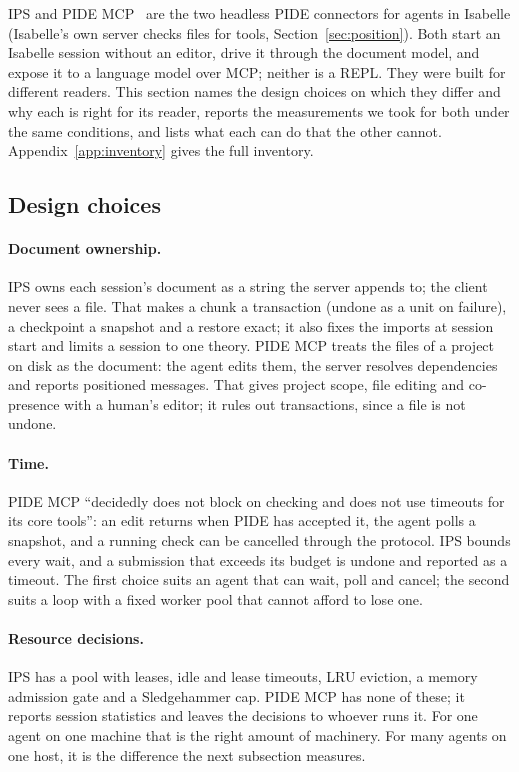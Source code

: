 \documentclass[11pt]{article}
\begin{document}
IPS and PIDE MCP~\cite{kappelmann2026pidemcp} are the two headless PIDE
connectors for agents in Isabelle (Isabelle's own server checks files for
tools, Section~\ref{sec:position}). Both start an Isabelle session without an
editor, drive it through the document model, and expose it to a language
model over MCP; neither is a REPL. They were built for different readers.
This section names the design choices on which they differ and why each
is right for its reader, reports the measurements we took for both under
the same conditions, and lists what each can do that the other cannot.
Appendix~\ref{app:inventory} gives the full inventory.

\subsection{Design choices}

\paragraph{Document ownership.} IPS owns each session's document as a
string the server appends to; the client never sees a file. That makes a
chunk a transaction (undone as a unit on failure), a checkpoint a snapshot
and a restore exact; it also fixes the imports at session start and limits
a session to one theory. PIDE MCP treats the files of a project on disk as
the document: the agent edits them, the server resolves dependencies and
reports positioned messages. That gives project scope, file editing and
co-presence with a human's editor; it rules out transactions, since a file
is not undone.

\paragraph{Time.} PIDE MCP ``decidedly does not block on checking and
does not use timeouts for its core tools'': an edit returns when PIDE has
accepted it, the agent polls a snapshot, and a running check can be
cancelled through the protocol. IPS bounds every wait, and a submission
that exceeds its budget is undone and reported as a timeout. The first
choice suits an agent that can wait, poll and cancel; the second suits a
loop with a fixed worker pool that cannot afford to lose one.

\paragraph{Resource decisions.} IPS has a pool with leases, idle and
lease timeouts, LRU eviction, a memory admission gate and a Sledgehammer
cap. PIDE MCP has none of these; it reports session statistics and leaves
the decisions to whoever runs it. For one agent on one machine that is
the right amount of machinery. For many agents on one host, it is the
difference the next subsection measures.
\end{document}

